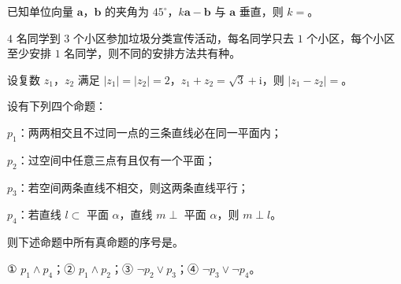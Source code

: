 \begin{question}
已知单位向量 $\boldsymbol a$，$\boldsymbol b$ 的夹角为 $45^\circ$，$k\boldsymbol a-\boldsymbol b$ 与 $\boldsymbol a$ 垂直，则 $k=$\gkblank{}。

\end{question}
\begin{question}
$4$ 名同学到 $3$ 个小区参加垃圾分类宣传活动，每名同学只去 $1$ 个小区，每个小区至少安排 $1$ 名同学，则不同的安排方法共有\gkblank{}种。

\end{question}
\begin{question}
设复数 $z_1$，$z_2$ 满足 $|z_1|=|z_2|=2$，$z_1+z_2=\sqrt3+\mathrm i$，则 $|z_1-z_2|=$\gkblank{}。

\end{question}
\begin{question}
设有下列四个命题：

$p_1$：两两相交且不过同一点的三条直线必在同一平面内；

$p_2$：过空间中任意三点有且仅有一个平面；

$p_3$：若空间两条直线不相交，则这两条直线平行；

$p_4$：若直线 $l\subset$ 平面 $\alpha$，直线 $m\perp$ 平面 $\alpha$，则 $m\perp l$。

则下述命题中所有真命题的序号是\gkblank{}。

① $p_1\wedge p_4$；② $p_1\wedge p_2$；③ $\neg p_2\vee p_3$；④ $\neg p_3\vee\neg p_4$。

\end{question}

